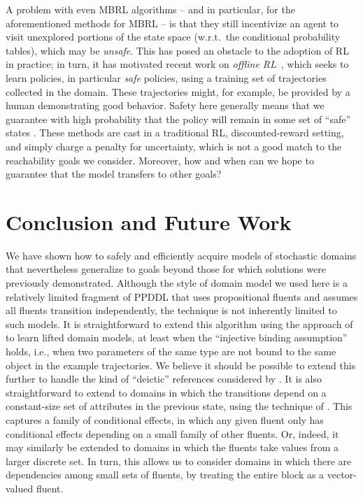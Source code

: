\documentclass[letterpaper]{article} %
\begin{document}
A problem with even MBRL algorithms -- and in particular, for the aforementioned methods for MBRL -- is that they still incentivize an agent to visit unexplored portions of the state space (w.r.t.\ the conditional probability tables), which may be \emph{unsafe}. 
This has posed an obstacle to the adoption of RL in practice; in turn, it has motivated recent work on \emph{offline RL}~\cite{levine2020offline,kidambi2020morel,yu2020mopo}, which seeks to learn policies, in particular \emph{safe} policies, using a training set of trajectories collected in the domain. These trajectories might, for example, be provided by a human demonstrating good behavior. 
Safety here generally means that we guarantee with high probability that the policy will remain in some set of ``safe'' states \cite{thomas2015safe,thomas2019preventing}. These methods are cast in a traditional RL, discounted-reward setting, and simply charge a penalty for uncertainty, which is not a good match to the reachability goals we consider.
Moreover, how and when can we hope to guarantee that the model transfers to other goals? 




\section{Conclusion and Future Work}
We have shown how to safely and efficiently acquire models of stochastic domains that nevertheless generalize to goals beyond those for which solutions were previously demonstrated. Although the style of domain model we used here is a relatively limited fragment of PPDDL that uses propositional fluents and assumes all fluents transition independently, the technique is not inherently limited to such models. It is straightforward to extend this algorithm using the approach of \citet{juba2021kr} to learn lifted domain models, at least when the ``injective binding assumption'' holds, i.e., when two parameters of the same type are not bound to the same object in the example trajectories. We believe it should be possible to extend this further to handle the kind of ``deictic'' references considered by \citet{pasula2007learning}. It is also straightforward to extend to domains in which the transitions depend on a constant-size set of attributes in the previous state, using the technique of \citet{strehl2007efficient}. This captures a family of conditional effects, in which any given fluent only has conditional effects depending on a small family of other fluents. Or, indeed, it may similarly be extended to domains in which the fluents take values from a larger discrete set. In turn, this allows us to consider domains in which there are dependencies among small sets of fluents, by treating the entire block as a vector-valued fluent. 
\end{document}
